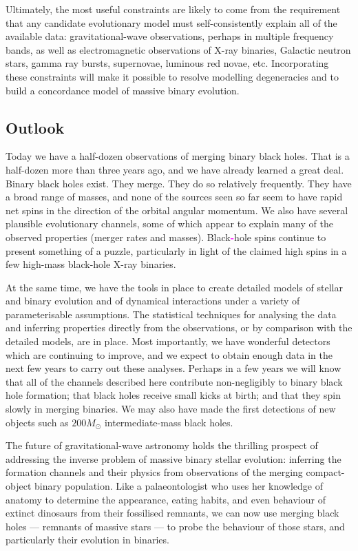 \documentclass[review]{elsarticle}
\newcommand{\ilya}[1]{\textcolor{magenta}{\bf{#1}}}
\begin{document}
Ultimately, the most useful constraints are likely to come from the requirement that any candidate evolutionary model must self-consistently explain all of the available data: gravitational-wave observations, perhaps in multiple frequency bands, as well as electromagnetic observations of X-ray binaries, Galactic neutron stars, gamma ray bursts, supernovae, luminous red novae, etc. Incorporating these constraints will make it possible to resolve modelling degeneracies and to build a concordance model of massive binary evolution.  

\subsection{Outlook}

Today we have a half-dozen observations of merging binary black holes.  That is a half-dozen more than three years ago, and we have already learned a great deal.  Binary black holes exist. They merge. They do so relatively frequently.  They have a broad range of masses, and none of the sources seen so far seem to have rapid net spins in the direction of the orbital angular momentum.  We also have several plausible evolutionary channels, some of which appear to explain many of the observed properties (merger rates and masses). Black\ilya{-}hole spins continue to present something of a puzzle, particularly in light of the claimed high spins in a few high-mass black-hole X-ray binaries.

At the same time, we have the tools in place to create detailed models of stellar and binary evolution and of dynamical interactions under a variety of parameterisable assumptions.  The statistical techniques for analysing the data and inferring properties directly from the observations, or by comparison with the detailed models, are in place.  Most importantly, we have wonderful detectors which are continuing to improve, and we expect to obtain enough data in the next few years to carry out these analyses.  Perhaps in a few years we will know that all of the channels described here contribute non-negligibly to binary black hole formation; that black holes receive small kicks at birth; and that they spin slowly in merging binaries. We may also have made the first detections of new objects such as $200 M_\odot$ intermediate-mass black holes.

The future of gravitational-wave astronomy holds the thrilling prospect of addressing the inverse problem of massive binary stellar evolution: inferring the formation channels and their physics from observations of the merging compact-object binary population.  Like a palaeontologist who uses her knowledge of anatomy to determine the appearance, eating habits, and even behaviour of extinct dinosaurs from their fossilised remnants, we can now use merging black holes --- remnants of massive stars --- to probe the behaviour of those stars, and particularly their evolution in binaries.
\end{document}
